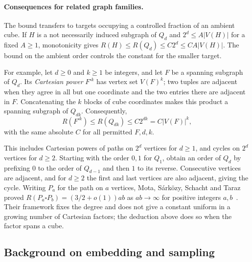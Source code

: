 \paragraph{Consequences for related graph families.}
The bound transfers to targets occupying a controlled fraction of an
ambient cube. If $H$ is a not necessarily induced subgraph of $Q_d$ and
$2^d\le A|V(H)|$ for a fixed $A\ge1$, monotonicity gives
$R(H)\le R(Q_d)\le C2^d\le CA|V(H)|$. The bound on the ambient order
controls the constant for the smaller target.

For example, let $d\ge0$ and $k\ge1$ be integers, and let $F$ be a
spanning subgraph of $Q_d$. Its \emph{Cartesian power} $F^{\square k}$
has vertex set $V(F)^k$; two tuples are adjacent when they agree in all
but one coordinate and the two entries there are adjacent in $F$.
Concatenating the $k$ blocks of cube coordinates makes this product a
spanning subgraph of $Q_{dk}$. Consequently,
\[
R(F^{\square k})\le R(Q_{dk})\le C2^{dk}=C|V(F)|^k,
\]
with the same absolute $C$ for all permitted $F,d,k$.

This includes Cartesian powers of paths on $2^d$ vertices for $d\ge1$,
and cycles on $2^d$ vertices for $d\ge2$. Starting with the order $0,1$
for $Q_1$, obtain an order of $Q_d$ by prefixing $0$ to the order of
$Q_{d-1}$ and then $1$ to its reverse. Consecutive vertices are adjacent,
and for $d\ge2$ the first and last vertices are also adjacent, giving the
cycle. Writing $P_a$ for the path on $a$ vertices, Mota, S\'ark\"ozy,
Schacht and Taraz proved
$R(P_a\square P_b)=(3/2+o(1))ab$ as $ab\to\infty$ for positive integers
$a,b$~\cite[Corollary~1.4]{mota-sarkozy-schacht-taraz2015}.
Their framework fixes the degree and does not give a constant uniform in
a growing number of Cartesian factors; the deduction above does so when
the factor spans a cube.

\subsection{Background on embedding and sampling}

